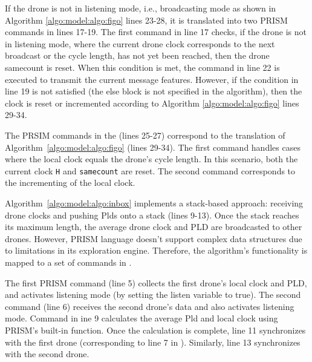 If the drone is not in listening mode, i.e., broadcasting mode as shown in Algorithm \ref{algo:model:algo:figo} lines 23-28, it is translated into two PRISM commands in  lines 17-19. The first command in line 17 checks, if the drone is not in listening mode, where the current drone clock corresponds to the next broadcast or the cycle length, has not yet been reached, then the drone samecount is reset. When this condition is met, the command in line 22 is executed to transmit the current message features. However, if the condition in line 19 is not satisfied (the else block is not specified in the algorithm), then the clock is reset or incremented according to Algorithm \ref{algo:model:algo:figo} lines 29-34.

The PRSIM commands in the  (lines 25-27) correspond to the translation of Algorithm~\ref{algo:model:algo:figo} (lines 29-34). The first command handles cases where the local clock equals the drone's cycle length. In this scenario, both the current clock \texttt{H} and \texttt{samecount} are reset. The second command corresponds to the incrementing of the local clock.






Algorithm~\ref{algo:model:algo:inbox} implements a stack-based approach: receiving drone clocks and pushing Plds onto a stack (lines 9-13). Once the stack reaches its maximum length, the average drone clock and PLD are broadcasted to other drones. However, PRISM language doesn't support complex data structures due to limitations in its exploration engine. Therefore, the algorithm's functionality is mapped to a set of commands in .

The first PRISM command (line 5) collects the first drone's local clock and PLD, and activates listening mode (by setting the listen variable to true). The second command (line 6) receives the second drone's data and also activates listening mode. Command in ine 9 calculates the average Pld and local clock using PRISM's built-in  function. Once the calculation is complete, line 11 synchronizes with the first drone (corresponding to line 7 in ). Similarly, line 13 synchronizes with the second drone.





